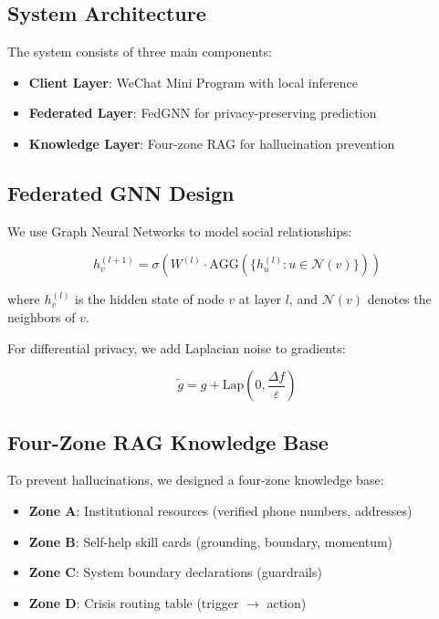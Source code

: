 \documentclass[preprint,12pt]{elsarticle}
\begin{document}
\subsection{System Architecture}

The system consists of three main components:

\begin{itemize}
    \item \textbf{Client Layer}: WeChat Mini Program with local inference

    \item \textbf{Federated Layer}: FedGNN for privacy-preserving prediction

    \item \textbf{Knowledge Layer}: Four-zone RAG for hallucination prevention
\end{itemize}

\subsection{Federated GNN Design}

We use Graph Neural Networks to model social relationships:

\begin{equation}
h_v^{(l+1)} = \sigma\left(W^{(l)} \cdot \text{AGG}\left(\{h_u^{(l)}: u \in \mathcal{N}(v)\}\right)\right)
\end{equation}

where $h_v^{(l)}$ is the hidden state of node $v$ at layer $l$, and
$\mathcal{N}(v)$ denotes the neighbors of $v$.

For differential privacy, we add Laplacian noise to gradients:

\begin{equation}
\tilde{g} = g + \text{Lap}\left(0, \frac{\Delta f}{\varepsilon}\right)
\end{equation}

\subsection{Four-Zone RAG Knowledge Base}

To prevent hallucinations, we designed a four-zone knowledge base:

\begin{itemize}
    \item \textbf{Zone A}: Institutional resources (verified phone numbers, addresses)
    \item \textbf{Zone B}: Self-help skill cards (grounding, boundary, momentum)
    \item \textbf{Zone C}: System boundary declarations (guardrails)
    \item \textbf{Zone D}: Crisis routing table (trigger $\rightarrow$ action)
\end{itemize}
\end{document}
